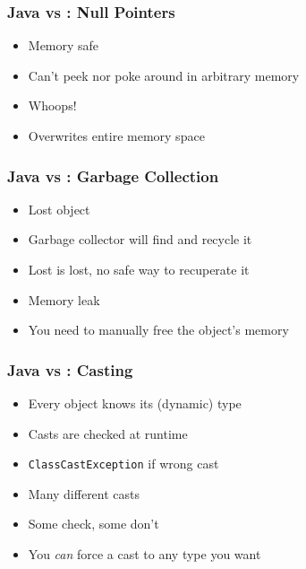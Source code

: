 \begin{frame}
  \frametitle{Java vs \cpp: Null Pointers}
  \begin{itemize}
    \item Memory safe
    \item Can't peek nor poke around in arbitrary memory
  \end{itemize}
  \vskip2mm
  \structure{\cpp}
  \begin{itemize}
    \item Whoops!
    \item Overwrites entire memory space
  \end{itemize}
\end{frame}

\begin{frame}
  \frametitle{Java vs \cpp: Garbage Collection}
  \begin{itemize}
    \item Lost object
    \item Garbage collector will find and recycle it
  \end{itemize}
  \vskip2mm
  \structure{\cpp}
  \begin{itemize}
    \item Lost is lost, no safe way to recuperate it
    \item Memory leak
    \item You need to manually free the object's memory
  \end{itemize}
\end{frame}

\begin{frame}
  \frametitle{Java vs \cpp: Casting}
  \begin{itemize}
    \item Every object knows its (dynamic) type
    \item Casts are checked at runtime
    \item \texttt{ClassCastException} if wrong cast
  \end{itemize}
  \vskip2mm
  \structure{\cpp}
  \begin{itemize}
    \item Many different casts
    \item Some check, some don't
    \item You \emph{can} force a cast to any type you want
  \end{itemize}
\end{frame}

